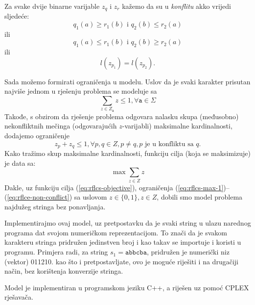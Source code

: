 \documentclass[a4paper, utf8, 11pt, colorlinks]{book}
\begin{document}
Za svake dvije binarne varijable $z_{q}$ i $z_{r}$ kažemo da su u \emph{konflitu} akko vrijedi sljedeće: $$ q_1(a) \geq r_1(b) \mbox{ i } q_2(b) \leq r_2(a)     $$ 
ili 
 $$ q_1(a) \leq r_1(b) \mbox{ i } q_2(b) \geq r_2(a)$$ 
ili 
$$ l(z_{p_1}) = l(z_{p_2}).$$

Sada možemo formirati ograničenja u modelu. Uslov da je svaki karakter prisutan najviše jednom u rješenju problema se modeluje sa 
\begin{equation}\label{eq:rflcs-max-1}
	 \sum_{z \in  Z_{\texttt{a} }} z \leq 1, \forall \texttt{a} \in \Sigma 
\end{equation}
Takođe, s obzirom da rješenje problema odgovara nalasku skupa (međusobno) nekonfliktnih mečinga (odgovarajućih $z$-varijabli) maksimalne kardinalnosti, dodajemo ograničenje
\begin{equation}\label{eq:rflce-non-conflict}
	 z_{p} + z_q \leq 1, \forall p,q \in Z, p\neq q, p\mbox{ je u konfliktu sa } q.
\end{equation}
Kako tražimo skup maksimalne kardinalnosti, funkciju cilja (koja se maksimizuje) je data sa:
\begin{equation}\label{eq:rflcs-objective}
	 \max \sum_{z \in Z } z 
\end{equation}
Dakle, uz funkciju cilja (\ref{eq:rflcs-objective}), ograničenja (\ref{eq:rflcs-max-1})--(\ref{eq:rflce-non-conflict}) sa uslovom $z \in \{0, 1\}, z \in Z$, dobili smo model problema najdužeg stringa bez ponavljanja. 

 Implementirajmo ovaj model, uz pretpostavku da je svaki string u ulazu narednog programa dat svojom numeričkom reprezentacijom. To znači da je svakom karakteru stringa pridružen jedinstven broj i kao takav se importuje i koristi u programu. Primjera radi, za string $s_1=\texttt{abbcba}$, pridružen je numerički niz (vektor) 011210. kao što i pretpostavljate, ovo je moguće riješiti i na drugačiji način, bez korištenja konverzije stringa. 
 
 Model je implementiran u programskom jeziku C++, a riješen uz pomoć CPLEX rješavača. 
 
\end{document}
